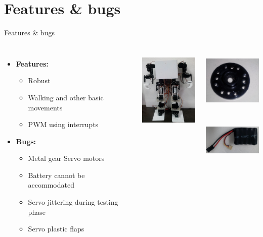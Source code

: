 \documentclass{beamer}
\begin{document}
\section{Features \& bugs}
\begin{frame}{Features \& bugs}
	\begin{columns}[c]
		\begin{itemize}
		\item \textbf{Features:}
		\begin{itemize}
			\item Robust
			\item Walking and other basic movements
			\item PWM using interrupts
		\end{itemize}
		
		\item \textbf{Bugs:}
		\begin{itemize}
			\item Metal gear Servo motors
			\item Battery cannot be accommodated
			\item Servo jittering during testing phase
			\item Servo plastic flaps
		\end{itemize}
	\end{itemize}
		
		\includegraphics[width=3cm,height=4cm]{body_assembly}\\
		
	
	\includegraphics[width=3cm,height=3cm]{flap}\\
	\includegraphics[width=3cm,height=3cm]{battery}
	\end{columns}
	
\end{frame}
\end{document}
